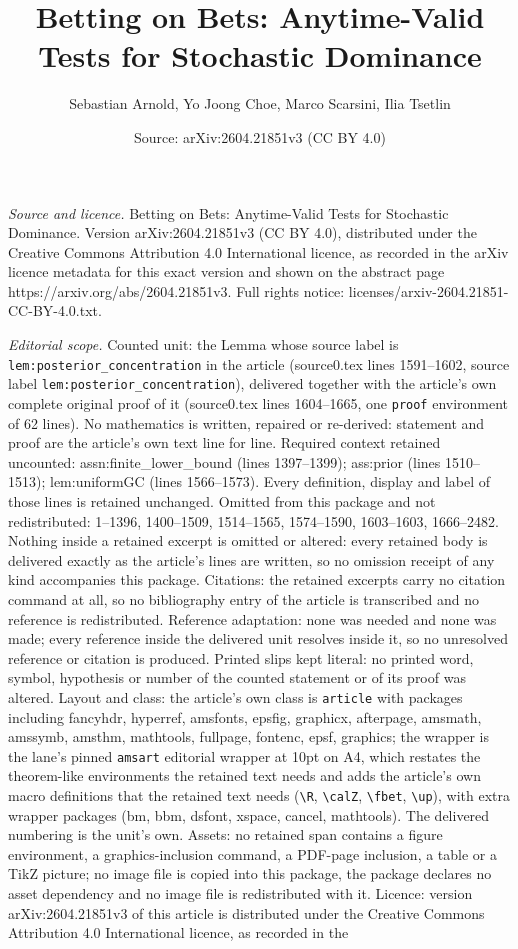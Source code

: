 \documentclass[10pt,a4paper]{amsart}
\title[Betting on Bets: Anytime-Valid Tests for Stochastic Dominanc]{Betting on Bets: Anytime-Valid Tests for Stochastic Dominance}
\author{Sebastian Arnold, Yo Joong Choe, Marco Scarsini, Ilia Tsetlin}
\date{Source: arXiv:2604.21851v3 (CC BY 4.0)}
\begin{document}
\maketitle

\noindent\emph{Source and licence.} Betting on Bets: Anytime-Valid Tests for Stochastic Dominance. Version arXiv:2604.21851v3 (CC BY 4.0), distributed under the Creative Commons Attribution 4.0 International licence, as recorded in the arXiv licence metadata for this exact version and shown on the abstract page https://arxiv.org/abs/2604.21851v3. Full rights notice: licenses/arxiv-2604.21851-CC-BY-4.0.txt.\par\smallskip

\noindent\textit{Editorial scope.} Counted unit: the Lemma whose source label is \texttt{lem:posterior\_concentration} in the article (source0.tex lines 1591--1602, source label \texttt{lem:posterior\_concentration}), delivered together with the article's own complete original proof of it (source0.tex lines 1604--1665, one \texttt{proof} environment of 62 lines). No mathematics is written, repaired or re-derived: statement and proof are the article's own text line for line. Required context retained uncounted: assn:finite\_lower\_bound (lines 1397--1399); ass:prior (lines 1510--1513); lem:uniformGC (lines 1566--1573). Every definition, display and label of those lines is retained unchanged. Omitted from this package and not redistributed: 1--1396, 1400--1509, 1514--1565, 1574--1590, 1603--1603, 1666--2482. Nothing inside a retained excerpt is omitted or altered: every retained body is delivered exactly as the article's lines are written, so no omission receipt of any kind accompanies this package. Citations: the retained excerpts carry no citation command at all, so no bibliography entry of the article is transcribed and no reference is redistributed. Reference adaptation: none was needed and none was made; every reference inside the delivered unit resolves inside it, so no unresolved reference or citation is produced. Printed slips kept literal: no printed word, symbol, hypothesis or number of the counted statement or of its proof was altered. Layout and class: the article's own class is \texttt{article} with packages including fancyhdr, hyperref, amsfonts, epsfig, graphicx, afterpage, amsmath, amssymb, amsthm, mathtools, fullpage, fontenc, epsf, graphics; the wrapper is the lane's pinned \texttt{amsart} editorial wrapper at 10pt on A4, which restates the theorem-like environments the retained text needs and adds the article's own macro definitions that the retained text needs (\texttt{\textbackslash R}, \texttt{\textbackslash calZ}, \texttt{\textbackslash fbet}, \texttt{\textbackslash up}), with extra wrapper packages (bm, bbm, dsfont, xspace, cancel, mathtools). The delivered numbering is the unit's own. Assets: no retained span contains a figure environment, a graphics-inclusion command, a PDF-page inclusion, a table or a TikZ picture; no image file is copied into this package, the package declares no asset dependency and no image file is redistributed with it. Licence: version arXiv:2604.21851v3 of this article is distributed under the Creative Commons Attribution 4.0 International licence, as recorded in the 
\end{document}
